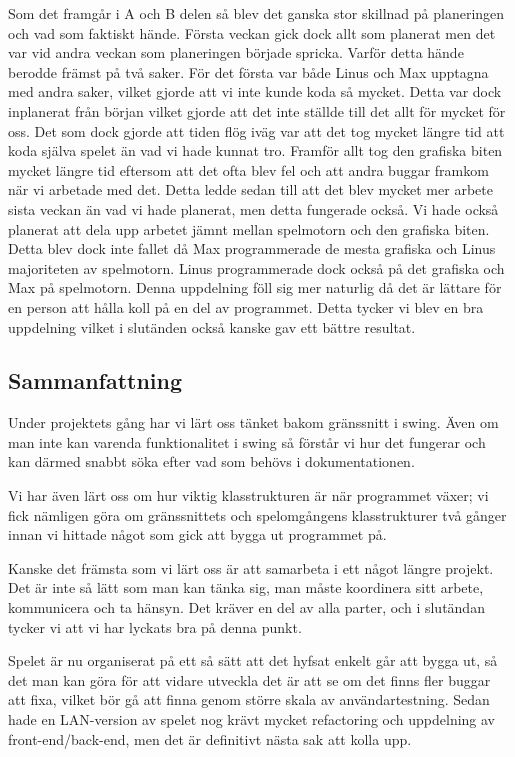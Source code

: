 \documentclass[10pt,a4paper]{article}
\begin{document}
Som det framgår i A och B delen så blev det ganska stor skillnad på planeringen och vad som faktiskt hände. Första veckan gick dock allt som planerat men det var vid andra veckan som planeringen började spricka. Varför detta hände berodde främst på två saker. För det första var både Linus och Max upptagna med andra saker, vilket gjorde att vi inte kunde koda så mycket. Detta var dock inplanerat från början vilket gjorde att det inte ställde till det allt för mycket för oss. Det som dock gjorde att tiden flög iväg var att det tog mycket längre tid att koda själva spelet än vad vi hade kunnat tro. Framför allt tog den grafiska biten mycket längre tid eftersom att det ofta blev fel och att andra buggar framkom när vi arbetade med det. Detta ledde sedan till att det blev mycket mer arbete sista veckan än vad vi hade planerat, men detta fungerade också. Vi hade också planerat att dela upp arbetet jämnt mellan spelmotorn och den grafiska biten. Detta blev dock inte fallet då Max programmerade de mesta grafiska och Linus majoriteten av spelmotorn. Linus programmerade dock också på det grafiska och Max på spelmotorn. Denna uppdelning föll sig mer naturlig då det är lättare för en person att hålla koll på en del av programmet. Detta tycker vi blev en bra uppdelning vilket i slutänden också kanske gav ett bättre resultat.

\subsection*{Sammanfattning}

Under projektets gång har vi lärt oss tänket bakom gränssnitt i swing. Även
om man inte kan varenda funktionalitet i swing så förstår vi hur det
fungerar och kan därmed snabbt söka efter vad som behövs i dokumentationen.

Vi har även lärt oss om hur viktig klasstrukturen är när programmet växer;
vi fick nämligen göra om gränssnittets och spelomgångens klasstrukturer två
gånger innan vi hittade något som gick att bygga ut programmet på.

Kanske det främsta som vi lärt oss är att samarbeta i ett något längre
projekt. Det är inte så lätt som man kan tänka sig, man måste koordinera
sitt arbete, kommunicera och ta hänsyn. Det kräver en del av alla parter,
och i slutändan tycker vi att vi har lyckats bra på denna punkt.

Spelet är nu organiserat på ett så sätt att det hyfsat enkelt går att bygga
ut, så det man kan göra för att vidare utveckla det är att se om det finns
fler buggar att fixa, vilket bör gå att finna genom större skala av
användartestning. Sedan hade en LAN-version av spelet nog krävt mycket
refactoring och uppdelning av front-end/back-end, men det är definitivt
nästa sak att kolla upp.
\end{document}
